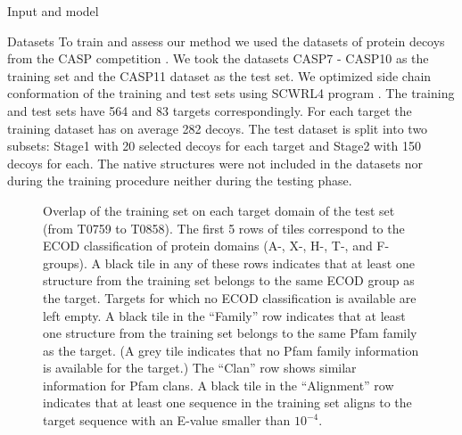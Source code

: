 \documentclass[final, unknownkeysallowed]{beamer}
\begin{document}
\begin{frame}{}
\begin{textblock}{19.5}
\begin{block}{Input and model}
\end{block}

\begin{block}{Datasets}
   To train and assess our method we used the datasets of protein decoys from the CASP competition \cite{moult2014critical}. 
We took the datasets CASP7 - CASP10 as the training set and the CASP11 dataset as the test set.
We optimized side chain conformation of the training and test sets using SCWRL4 program \cite{krivov2009improved}.
The training and test sets have 564 and 83 targets correspondingly. For each target the training dataset has 
on average 282 decoys. The test dataset is split into two subsets: Stage1 with 20 selected decoys for each target and Stage2 with 150 decoys
for each. The native structures were not included in the datasets nor during the training procedure
neither during the testing phase.
\begin{figure}[H]
%
    \caption{Overlap of the training set on each target domain of the
    test set (from T0759 to T0858). The first 5 rows of tiles
    correspond to the ECOD classification of protein domains (A-, X-,
    H-, T-, and F-groups). A black tile in any of these rows indicates
    that at least one structure from the training set belongs to the
    same ECOD group as the target. Targets for which no ECOD
    classification is available are left empty.
    A black tile in the ``Family'' row indicates that at least one
    structure from the training set belongs to the same Pfam family as
    the target. (A grey tile indicates that no Pfam family information
    is available for the target.) The ``Clan'' row shows similar
    information for Pfam clans. A black tile in the ``Alignment'' row
    indicates that at least one sequence in the training set aligns to
    the target sequence with an E-value smaller than $10^{-4}$.}
%
    \label{Fig:summaryTable}
\end{figure}


\end{block}
\end{textblock}
\end{frame}
\end{document}
